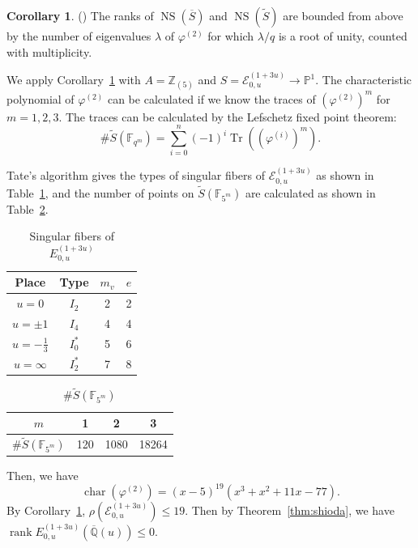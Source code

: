 \documentclass[a4paper]{jarticle} %
\theoremstyle{definition}
\newtheorem{cor}[thm]{Corollary}
\theoremstyle{remark}
\DeclareMathOperator{\rank}{rank}
\DeclareMathOperator{\NS}{NS}
\DeclareMathOperator{\Tr}{Tr}
\DeclareMathOperator{\chara}{char}
\begin{document}
\begin{cor}{(\cite[Corollary 6.4.]{ref:vanluijk2007})}
    \label{cor:ns_upper_bound}
    The ranks of $\NS (\overline{S})$ and $\NS (\tilde{S})$ are bounded from above by the number of eigenvalues $\lambda$ of $\varphi^{(2)}$ for which $\lambda/q$ is a root of unity, counted with multiplicity.
\end{cor}

We apply Corollary~\ref{cor:ns_upper_bound} with $A = \mathbb{Z}_{(5)}$ and $S = \mathcal{E}_{0,u}^{(1 + 3u)} \to \mathbb{P}^1$.
The characteristic polynomial of $\varphi^{(2)}$ can be calculated if we know the traces of $(\varphi^{(2)})^m$ for $m=1,2,3$.
The traces can be calculated by the Lefschetz fixed point theorem:
\begin{equation*}
    \# \tilde{S}(\mathbb{F}_{q^{m}}) = \sum_{i = 0}^{n} ( - 1)^{i} \Tr((\varphi^{(i)})^{m}).
\end{equation*}

Tate's algorithm gives the types of singular fibers of $\mathcal{E}_{0,u}^{(1 + 3u)}$ as shown in Table~\ref{tab:E_{0,u}^{(1 + 3u)}}, 
and the number of points on $\tilde{S}(\mathbb{F}_{5^{m}})$ are calculated as shown in Table~\ref{tab:tm}.

\begin{table}[ht]
    \centering
    \caption{Singular fibers of $E_{0,u}^{(1 + 3u)}$}
    \begin{tabular}{|c|c|c|c|}
        \hline
        Place            & Type    & $m_v$ & $e$ \\
        \hline
        $u=0$            & $I_2$   & 2     & 2   \\
        $u=\pm 1$        & $I_4$   & 4     & 4   \\
        $u=-\frac{1}{3}$ & $I_0^*$ & 5     & 6   \\
        $u=\infty$       & $I_2^*$ & 7     & 8   \\
        \hline
    \end{tabular}
    \label{tab:E_{0,u}^{(1 + 3u)}}
\end{table}

\begin{table}[ht]
    \centering
    \caption{$\# \tilde{S}(\mathbb{F}_{5^{m}})$}
    \begin{tabular}{|c|c|c|c|}
        \hline
        $m$                              & 1   & 2    & 3     \\
        \hline
        $\# \tilde{S}(\mathbb{F}_{5^m})$ & 120 & 1080 & 18264 \\
        \hline
    \end{tabular}
    \label{tab:tm}
\end{table}

Then, we have
\begin{equation*}
    \chara(\varphi^{(2)}) = (x - 5)^{19}(x^{3} + x^{2} + 11 x - 77).
\end{equation*}
By Corollary~\ref{cor:ns_upper_bound}, $\rho(\mathcal{E}_{0,u}^{(1 + 3u)}) \leq 19$.
Then by Theorem~\ref{thm:shioda}, we have $\rank E_{0,u}^{(1 + 3u)}(\overline{\mathbb{Q}}(u)) \leq 0$.

\printbibliography
\end{document}

